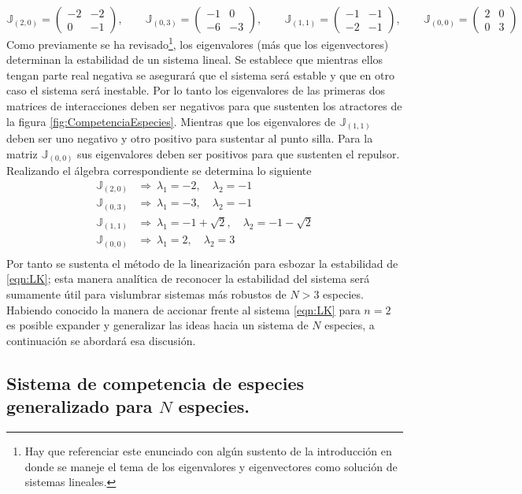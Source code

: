 \documentclass[11pt,a4paper]{article}
\begin{document}
$$
\mathbb{J}_{(2,0)} = \begin{pmatrix}
	-2 & -2\\
	0 & -1
\end{pmatrix},\qquad \mathbb{J}_{(0,3)}=\begin{pmatrix}
-1 & 0\\
-6 & -3
\end{pmatrix},\qquad \mathbb{J}_{(1,1)}=\begin{pmatrix}
-1 & -1\\
-2 & -1
\end{pmatrix},\qquad \mathbb{J}_{(0,0)}=\begin{pmatrix}
2 & 0 \\
0 & 3
\end{pmatrix}
$$
Como previamente se ha revisado\footnote{Hay que referenciar este enunciado con algún sustento de la introducción en donde se maneje el tema de los eigenvalores y eigenvectores como solución de sistemas lineales.}, los eigenvalores (más que los eigenvectores) determinan la estabilidad de un sistema lineal. Se establece que mientras ellos tengan parte real negativa se asegurará que el sistema será estable y que en otro caso el sistema será inestable. Por lo tanto los eigenvalores de las primeras dos matrices de interacciones deben ser negativos para que sustenten los atractores de la figura \ref{fig:CompetenciaEspecies}. Mientras que los eigenvalores de $\mathbb{J}_{(1,1)}$ deben ser uno negativo y otro positivo para sustentar al punto silla. Para la matriz $\mathbb{J}_{(0,0)}$ sus eigenvalores deben ser positivos para que sustenten el repulsor. Realizando el álgebra correspondiente se determina lo siguiente
\begin{align*}
	\mathbb{J}_{(2,0)}&\Longrightarrow\ \lambda_1 = -2,\quad\lambda_2 = -1\\
	\mathbb{J}_{(0,3)}&\Longrightarrow\ \lambda_1 = -3,\quad\lambda_2 = -1\\
	\mathbb{J}_{(1,1)}&\Longrightarrow\ \lambda_1 = -1+\sqrt{2},\quad\lambda_2 = -1-\sqrt{2}\\
	\mathbb{J}_{(0,0)}&\Longrightarrow\ \lambda_1 = 2,\quad\lambda_2 = 3\\
\end{align*}
Por tanto se sustenta el método de la linearización para esbozar la estabilidad de \ref{eqn:LK}; esta manera analítica de reconocer la estabilidad del sistema será sumamente útil para vislumbrar sistemas más robustos de $N>3$ especies. Habiendo conocido la manera de accionar frente al sistema \ref{eqn:LK} para $n=2$ es posible expander y generalizar las ideas hacia un sistema de $N$ especies, a continuación se abordará esa discusión.

\subsection{Sistema de competencia de especies generalizado para $N$ especies.}
 
\end{document}
